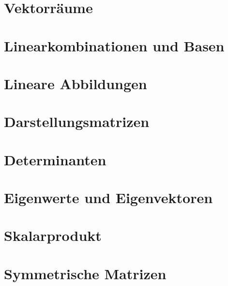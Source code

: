 \pagebreak

\section{Vektorräume}

\section{Linearkombinationen und Basen}

\section{Lineare Abbildungen}

\section{Darstellungsmatrizen}

\section{Determinanten}

\section{Eigenwerte und Eigenvektoren}

\section{Skalarprodukt}

\pagebreak

\section{Symmetrische Matrizen}

\pagebreak
